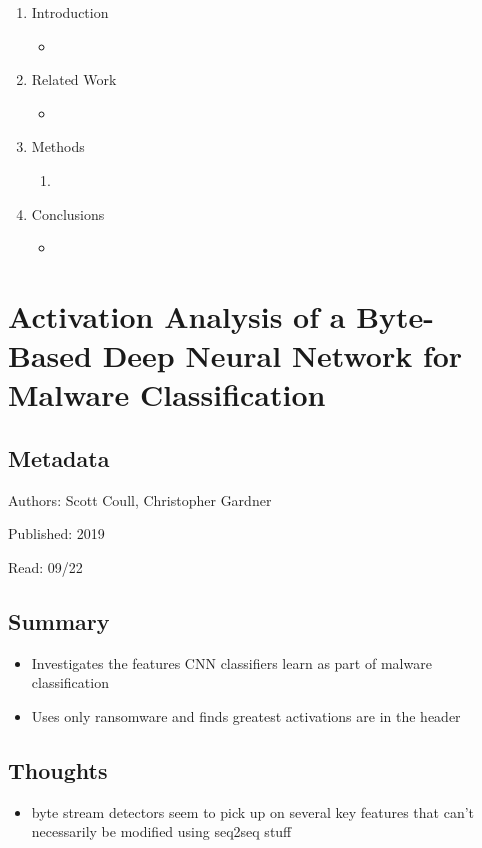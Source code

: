 \documentclass{article}
\begin{document}
\begin{enumerate}
	\item Introduction
	\begin{itemize}
		\item 
	\end{itemize}
	\item Related Work
	\begin{itemize}
		\item 
	\end{itemize}
	\item Methods
	\begin{enumerate}
		\item 
	\end{enumerate}
	\item Conclusions
	\begin{itemize}
		\item 
	\end{itemize}
\end{enumerate}

\pagebreak


\section*{Activation Analysis of a Byte-Based Deep Neural Network for Malware Classification}

\subsection*{Metadata}

\noindent Authors: Scott Coull, Christopher Gardner

\noindent Published: 2019

\noindent Read: 09/22

\subsection*{Summary}
\begin{itemize}
	\item Investigates the features CNN classifiers learn as part of malware classification
	\item Uses only ransomware and finds greatest activations are in the header
\end{itemize}

\subsection*{Thoughts}
\begin{itemize}
	\item byte stream detectors seem to pick up on several key features that can't necessarily be modified using seq2seq stuff
\end{itemize}
\end{document}
